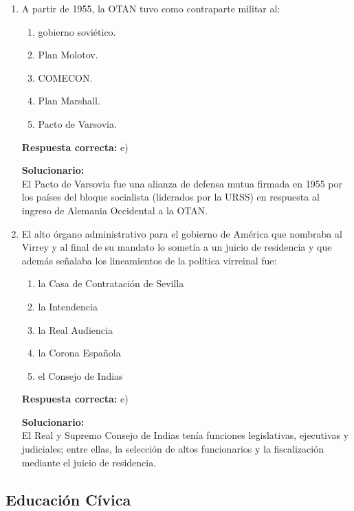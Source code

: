 \begin{enumerate}
	\vspace{6mm}
	
	\item A partir de 1955, la OTAN tuvo como contraparte militar al:
	\begin{enumerate}[label=\alph*)]
		\item gobierno soviético.
		\item Plan Molotov.
		\item COMECON.
		\item Plan Marshall.
		\item Pacto de Varsovia.
	\end{enumerate}
	\textbf{Respuesta correcta:} e)
	
	\vspace{2mm}
	\textbf{Solucionario:}\\
	El Pacto de Varsovia fue una alianza de defensa mutua firmada en 1955 por los países del bloque socialista (liderados por la URSS) en respuesta al ingreso de Alemania Occidental a la OTAN.
	
	\vspace{6mm}
	
	\item El alto órgano administrativo para el gobierno de América que nombraba al Virrey y al final de su mandato lo sometía a un juicio de residencia y que además señalaba los lineamientos de la política virreinal fue:
	\begin{enumerate}[label=\alph*)]
		\item la Casa de Contratación de Sevilla
		\item la Intendencia
		\item la Real Audiencia
		\item la Corona Española
		\item el Consejo de Indias
	\end{enumerate}
	\textbf{Respuesta correcta:} e)
	
	\vspace{2mm}
	\textbf{Solucionario:}\\
	El Real y Supremo Consejo de Indias tenía funciones legislativas, ejecutivas y judiciales; entre ellas, la selección de altos funcionarios y la fiscalización mediante el juicio de residencia.
	
	\vspace{6mm}
\end{enumerate}


\subsection*{Educación Cívica}

